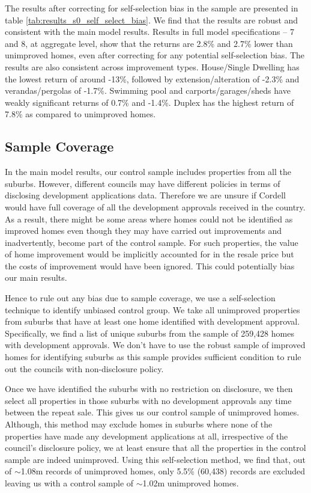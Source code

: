 \documentclass[AEJ,reqno, draftmode]{AEA} %
\begin{document}
The results after correcting for self-selection bias in the sample are presented in table \ref{tab:results_s0_self_select_bias}. We find that the results are robust and consistent with the main model results. Results in full model specifications -- 7 and 8, at aggregate level, show that the returns are 2.8\% and 2.7\% lower than unimproved homes, even after correcting for any potential self-selection bias. The results are also consistent across improvement types. House/Single Dwelling has the lowest return of around -13\%, followed by extension/alteration of -2.3\% and verandas/pergolas of -1.7\%. Swimming pool and carports/garages/sheds have weakly significant returns of 0.7\% and -1.4\%. Duplex has the highest return of 7.8\% as compared to unimproved homes.




\restoregeometry




\subsection{Sample Coverage}

In the main model results, our control sample includes properties from all the suburbs. However, different councils may have different policies in terms of disclosing development applications data. Therefore we are unsure if Cordell would have full coverage of all the development approvals received in the country. As a result, there might be some areas where homes could not be identified as improved homes even though they may have carried out improvements and inadvertently, become part of the control sample. For such properties, the value of home improvement would be implicitly accounted for in the resale price but the costs of improvement would have been ignored. This could potentially bias our main results. 

Hence to rule out any bias due to sample coverage, we use a self-selection technique to identify unbiased control group. We take all unimproved properties from suburbs that have at least one home identified with development approval. Specifically, we find a list of unique suburbs from the sample of 259,428 homes with development approvals. We don't have to use the robust sample of improved homes for identifying suburbs as this sample provides sufficient condition to rule out the councils with non-disclosure policy. 

Once we have identified the suburbs with no restriction on disclosure, we then select all properties in those suburbs with no development approvals any time between the repeat sale. This gives us our control sample of unimproved homes. Although, this method may exclude homes in suburbs where none of the properties have made any development applications at all, irrespective of the council's disclosure policy, we at least ensure that all the properties in the control sample are indeed unimproved. Using this self-selection method, we find that, out of $\sim$1.08m records of unimproved homes, only 5.5\% (60,438) records are excluded leaving us with a control sample of $\sim$1.02m unimproved homes. 
\end{document}
